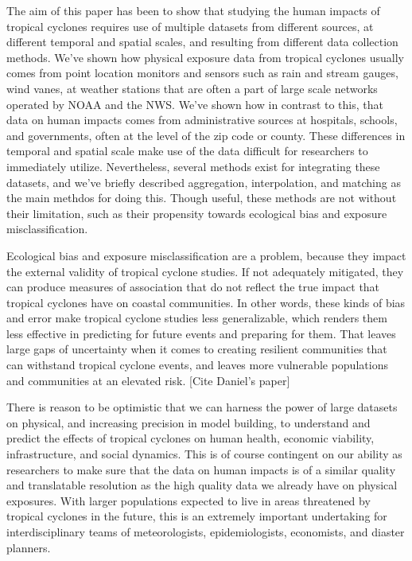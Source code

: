 \documentclass[
]{article}
\begin{document}
The aim of this paper has been to show that studying the human impacts
of tropical cyclones requires use of multiple datasets from different
sources, at different temporal and spatial scales, and resulting from
different data collection methods. We've shown how physical exposure
data from tropical cyclones usually comes from point location monitors
and sensors such as rain and stream gauges, wind vanes, at weather
stations that are often a part of large scale networks operated by NOAA
and the NWS. We've shown how in contrast to this, that data on human
impacts comes from administrative sources at hospitals, schools, and
governments, often at the level of the zip code or county. These
differences in temporal and spatial scale make use of the data difficult
for researchers to immediately utilize. Nevertheless, several methods
exist for integrating these datasets, and we've briefly described
aggregation, interpolation, and matching as the main methdos for doing
this. Though useful, these methods are not without their limitation,
such as their propensity towards ecological bias and exposure
misclassification.

Ecological bias and exposure misclassification are a problem, because
they impact the external validity of tropical cyclone studies. If not
adequately mitigated, they can produce measures of association that do
not reflect the true impact that tropical cyclones have on coastal
communities. In other words, these kinds of bias and error make tropical
cyclone studies less generalizable, which renders them less effective in
predicting for future events and preparing for them. That leaves large
gaps of uncertainty when it comes to creating resilient communities that
can withstand tropical cyclone events, and leaves more vulnerable
populations and communities at an elevated risk. {[}Cite Daniel's
paper{]}

There is reason to be optimistic that we can harness the power of large
datasets on physical, and increasing precision in model building, to
understand and predict the effects of tropical cyclones on human health,
economic viability, infrastructure, and social dynamics. This is of
course contingent on our ability as researchers to make sure that the
data on human impacts is of a similar quality and translatable
resolution as the high quality data we already have on physical
exposures. With larger populations expected to live in areas threatened
by tropical cyclones in the future, this is an extremely important
undertaking for interdisciplinary teams of meteorologists,
epidemiologists, economists, and diaster planners.
\end{document}
